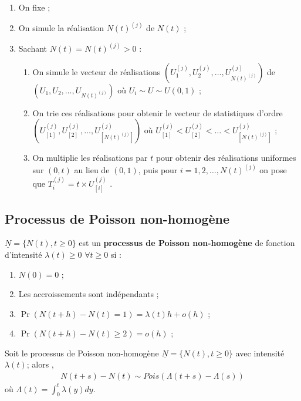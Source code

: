 \documentclass[10pt, french]{article}
\begin{document}
\begin{multicols*}{2}
\begin{algo2}
\begin{enumerate}
	\item	On fixe  ;
	\item	On simule la réalisation $N(t)^{(j)}$ de $N(t)$ ;
	\item	Sachant $N(t)	=	N(t)^{(j)}	>	0$ :
		\begin{enumerate}[label = \alph*)]
		\item	On simule le vecteur de réalisations $\left( U_{1}^{(j)}, U_{2}^{(j)}, \dots, U_{N(t)^{(j)}}^{(j)}\right)$ de $\left( U_{1}, U_{2}, \dots, U_{N(t)^{(j)}}\right)$ où $U_{i} \sim U \sim U(0, 1)$ ;
		\item	On trie ces réalisations pour obtenir le vecteur de statistiques d'ordre $\left( U_{[1]}^{(j)}, U_{[2]}^{(j)}, \dots, U_{[N(t)^{(j)}]}^{(j)}\right)$ où $ U_{[1]}^{(j)} < U_{[2]}^{(j)}< \dots < U_{[N(t)^{(j)}]}^{(j)}$ ;
		\item	On multiplie les réalisations par $t$ pour obtenir des réalisations uniformes sur $(0, t)$ au lieu de $(0, 1)$, puis pour $i	=	1, 2, \dots, N(t)^{(j)}$ on pose que $T_{i}^{(j)}	=	t \times U_{[i]}^{(j)}$ .
		\end{enumerate}
\end{enumerate}
\end{algo2}


\columnbreak
\subsection{Processus de Poisson non-homogène}
\begin{definitionNOHFILLsub}
$\underline{N}	=	\{N(t), t \geq 0\}$ est un \textbf{processus de Poisson non-homogène} de fonction d'intensité $\lambda(t)	\geq 0$ $\forall t \geq 0$ si :
\begin{enumerate}
	\item	$N(0)	=	0$ ;
	\item	Les accroissements sont indépendants ;
	\item	$\Pr(N(t + h) - N(t)	=	1)	=	\lambda(t)h + o(h)$ ;
	\item	$\Pr(N(t + h) - N(t)	\geq	2)	=	o(h)$ ;
\end{enumerate}
\end{definitionNOHFILLsub}

\begin{definitionNOHFILLpropos}[Proposition :	]
Soit le processus de Poisson non-homogène $\underline{N}	=	\{N(t), t \geq 0\}$ avec intensité $\lambda(t)$; alors ,
\begin{align*}
	N(t + s) - N(t)
	\sim	Pois\left(\Lambda(t + s) - \Lambda(s)\right)
\end{align*}
où $\Lambda(t)	=	\int_{0}^{t}\lambda(y)dy$.


\end{definitionNOHFILLpropos}
\end{multicols*}
\end{document}

